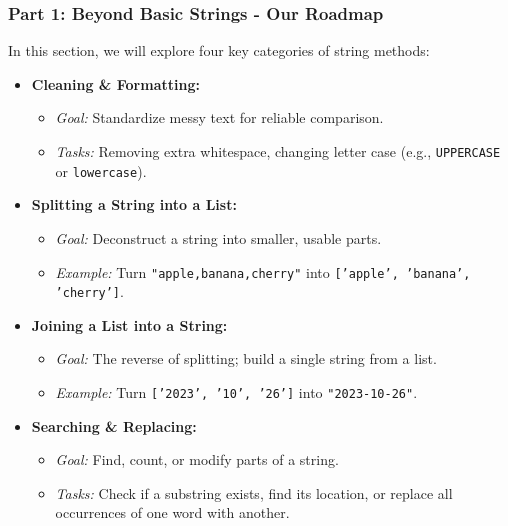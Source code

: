 \documentclass{beamer}
\begin{document}
\begin{frame}[fragile]
    \frametitle{Part 1: Beyond Basic Strings - Our Roadmap}
    In this section, we will explore four key categories of string methods:

    \begin{itemize}
        \item \textbf{Cleaning \& Formatting:}
        \begin{itemize}
            \item \textit{Goal:} Standardize messy text for reliable comparison.
            \item \textit{Tasks:} Removing extra whitespace, changing letter case (e.g., \texttt{UPPERCASE} or \texttt{lowercase}).
        \end{itemize}

        \item \textbf{Splitting a String into a List:}
        \begin{itemize}
            \item \textit{Goal:} Deconstruct a string into smaller, usable parts.
            \item \textit{Example:} Turn \texttt{"apple,banana,cherry"} into \texttt{['apple', 'banana', 'cherry']}.
        \end{itemize}

        \item \textbf{Joining a List into a String:}
        \begin{itemize}
            \item \textit{Goal:} The reverse of splitting; build a single string from a list.
            \item \textit{Example:} Turn \texttt{['2023', '10', '26']} into \texttt{"2023-10-26"}.
        \end{itemize}

        \item \textbf{Searching \& Replacing:}
        \begin{itemize}
            \item \textit{Goal:} Find, count, or modify parts of a string.
            \item \textit{Tasks:} Check if a substring exists, find its location, or replace all occurrences of one word with another.
        \end{itemize}
    \end{itemize}

\end{frame}
\end{document}
